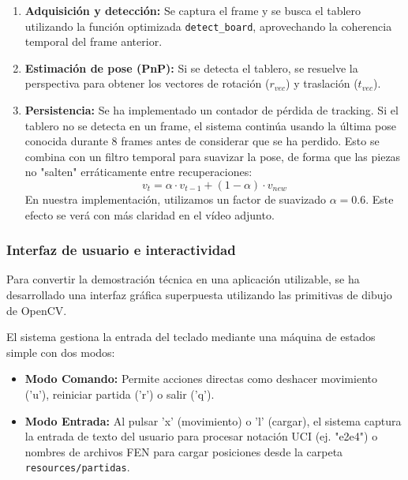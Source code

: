 \documentclass[11pt,a4paper]{article}
\begin{document}
\begin{enumerate}
    \item \textbf{Adquisición y detección:} Se captura el frame y se busca el tablero utilizando la función optimizada \texttt{detect\_board}, aprovechando la coherencia temporal del frame anterior.
    
    \item \textbf{Estimación de pose (PnP):} Si se detecta el tablero, se resuelve la perspectiva para obtener los vectores de rotación ($r_{vec}$) y traslación ($t_{vec}$).
    
    \item \textbf{Persistencia:} Se ha implementado un contador de pérdida de tracking. Si el tablero no se detecta en un frame, el sistema continúa usando la última pose
    conocida durante 8 frames antes de considerar que se ha perdido.
    Esto se combina con un filtro temporal para suavizar la pose, de forma que las piezas no "salten" erráticamente entre recuperaciones:
    \begin{equation}
    v_{t} = \alpha \cdot v_{t-1} + (1 - \alpha) \cdot v_{new}
    \end{equation}
    En nuestra implementación, utilizamos un factor de suavizado $\alpha = 0.6$. Este efecto se verá con más claridad en el vídeo adjunto.
\end{enumerate}

\subsubsection{Interfaz de usuario e interactividad}

Para convertir la demostración técnica en una aplicación utilizable, se ha desarrollado una interfaz gráfica superpuesta 
utilizando las primitivas de dibujo de OpenCV.

El sistema gestiona la entrada del teclado mediante una máquina de estados simple con dos modos:
\begin{itemize}
    \item \textbf{Modo Comando:} Permite acciones directas como deshacer movimiento ('u'), reiniciar partida ('r') o salir ('q').
    \item \textbf{Modo Entrada:} Al pulsar 'x' (movimiento) o 'l' (cargar), el sistema captura la entrada de texto del usuario para procesar notación UCI (ej. "e2e4") o nombres de archivos FEN para cargar posiciones desde la carpeta \texttt{resources/partidas}.
\end{itemize}
\end{document}
